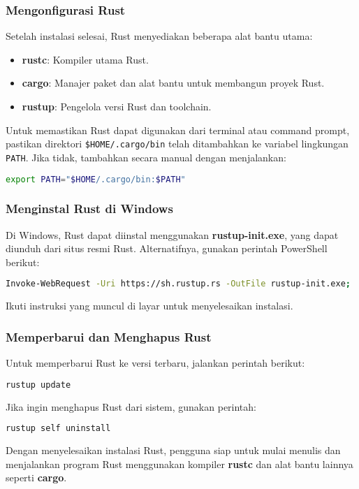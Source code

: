 \subsubsection{Mengonfigurasi Rust}
Setelah instalasi selesai, Rust menyediakan beberapa alat bantu utama:
\begin{itemize}
	\item \textbf{rustc}: Kompiler utama Rust.
	\item \textbf{cargo}: Manajer paket dan alat bantu untuk membangun proyek Rust.
	\item \textbf{rustup}: Pengelola versi Rust dan toolchain.
\end{itemize}

Untuk memastikan Rust dapat digunakan dari terminal atau command prompt, pastikan direktori \texttt{\$HOME/.cargo/bin} telah ditambahkan ke variabel lingkungan \texttt{PATH}. Jika tidak, tambahkan secara manual dengan menjalankan:
\begin{lstlisting}[language=bash]
	export PATH="$HOME/.cargo/bin:$PATH"
\end{lstlisting}

\subsubsection{Menginstal Rust di Windows}
Di Windows, Rust dapat diinstal menggunakan \textbf{rustup-init.exe}, yang dapat diunduh dari situs resmi Rust. Alternatifnya, gunakan perintah PowerShell berikut:
\begin{lstlisting}[language=bash]
	Invoke-WebRequest -Uri https://sh.rustup.rs -OutFile rustup-init.exe; ./rustup-init.exe
\end{lstlisting}
Ikuti instruksi yang muncul di layar untuk menyelesaikan instalasi.

\subsubsection{Memperbarui dan Menghapus Rust}
Untuk memperbarui Rust ke versi terbaru, jalankan perintah berikut:
\begin{lstlisting}[language=bash]
	rustup update
\end{lstlisting}
Jika ingin menghapus Rust dari sistem, gunakan perintah:
\begin{lstlisting}[language=bash]
	rustup self uninstall
\end{lstlisting}

Dengan menyelesaikan instalasi Rust, pengguna siap untuk mulai menulis dan menjalankan program Rust menggunakan kompiler \textbf{rustc} dan alat bantu lainnya seperti \textbf{cargo}.

